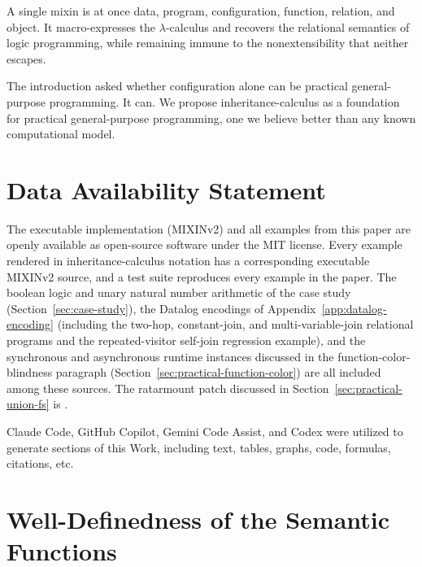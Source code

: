 A single mixin is at once data, program, configuration,
function, relation, and object.
It macro-expresses the $\lambda$-calculus and recovers the
relational semantics of logic programming, while remaining
immune to the nonextensibility that neither escapes.

The introduction asked whether configuration alone can be
practical general-purpose programming.
It can.
We propose inheritance-calculus as a foundation for practical
general-purpose programming, one we believe better than any
known computational model.

\section{Data Availability Statement}

The executable implementation (MIXINv2) and all examples from
this paper are openly available as open-source software under
the MIT license.
Every example rendered in inheritance-calculus notation has a
corresponding executable MIXINv2 source, and a test suite
reproduces every example in the paper.
The boolean logic and unary natural number arithmetic of the case
study (Section~\ref{sec:case-study}), the Datalog encodings of
Appendix~\ref{app:datalog-encoding} (including the two-hop,
constant-join, and multi-variable-join relational programs and the
repeated-visitor self-join regression example), and the synchronous
and asynchronous runtime instances discussed in the
function-color-blindness paragraph
(Section~\ref{sec:practical-function-color}) are all included among
these sources.
The ratarmount patch discussed in
Section~\ref{sec:practical-union-fs} is
.

\begin{acks}
  Claude Code, GitHub Copilot, Gemini Code Assist, and Codex were utilized to generate sections of this Work,
  including text, tables, graphs, code, formulas, citations, etc.
\end{acks}
\fi %

\ifInheritanceAppendix
\appendix

\section{Well-Definedness of the Semantic Functions}
\label{app:well-definedness}

